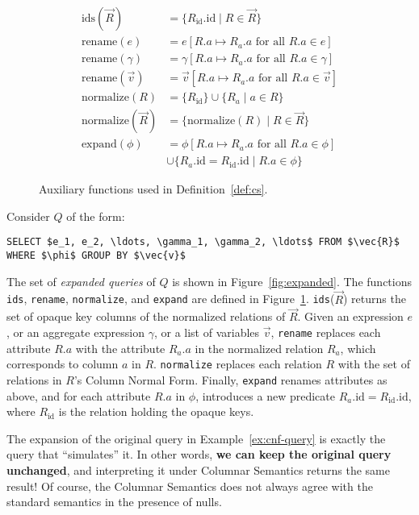 \documentclass[sigconf,nonacm]{acmart}
\begin{document}
\begin{figure}
\begin{align*}
\text{ids}(\vec{R}) &= \{ R_\text{id}.\text{id} \mid R \in \vec{R} \} \\
\text{rename}(e) &= e[R.a \mapsto R_a.a \text{ for all } R.a \in e] \\
\text{rename}(\gamma) &= \gamma[R.a \mapsto R_a.a \text{ for all } R.a \in \gamma] \\
\text{rename}(\vec{v}) &= \vec{v}[R.a \mapsto R_a.a \text{ for all } R.a \in \vec{v}] \\
\text{normalize}(R) &= \{ R_\text{id} \} \cup \{ R_a \mid a \in R \} \\
\text{normalize}(\vec{R}) &= \{ \text{normalize}(R) \mid R \in \vec{R} \} \\
\text{expand}(\phi) &= \phi[R.a \mapsto R_a.a \text{ for all } R.a \in \phi] \\
&\cup \{ R_a.\text{id} = R_\text{id}.\text{id} \mid R.a \in \phi \}
\end{align*}
\caption{Auxiliary functions used in Definition~\ref{def:cs}.}
\label{fig:aux}
\end{figure}

\begin{definition}
\label{def:cs}  
Consider $Q$ of the form:
%
\begin{lstlisting}
SELECT $e_1, e_2, \ldots, \gamma_1, \gamma_2, \ldots$ FROM $\vec{R}$ WHERE $\phi$ GROUP BY $\vec{v}$
\end{lstlisting}
%
The set of {\em expanded queries} of $Q$ is shown in Figure~\ref{fig:expanded}.
The functions \lstinline|ids|, 
 \lstinline|rename|, 
 \lstinline|normalize|, and \lstinline|expand| 
 are defined in Figure~\ref{fig:aux}.
\lstinline|ids|($\vec{R}$) returns the set of opaque key columns
 of the normalized relations of $\vec{R}$.
Given an expression $e$, or an aggregate expression $\gamma$,
 or a list of variables $\vec{v}$, 
 \lstinline|rename| replaces each attribute $R.a$ 
 with the attribute $R_a.a$ 
 in the normalized relation $R_a$, 
 which corresponds to column $a$ in $R$.
\lstinline|normalize| replaces each relation $R$ 
 with the set of relations in $R$'s Column Normal Form.
Finally, \lstinline|expand| renames attributes as above, 
 and for each attribute $R.a$ in $\phi$, 
 introduces a new predicate $R_a.\text{id} = R_\text{id}.\text{id}$,
 where $R_\text{id}$ is the relation holding the opaque keys.
\end{definition}

\begin{example}
\label{ex:cs}
The expansion of the original query in Example~\ref{ex:cnf-query} is
 exactly the query that ``simulates'' it.
In other words, \textbf{we can keep the original query unchanged},
 and interpreting it under Columnar Semantics
 returns the same result!
Of course, the Columnar Semantics does not 
 always agree with the standard semantics
 in the presence of nulls.
\end{example}
\end{document}
